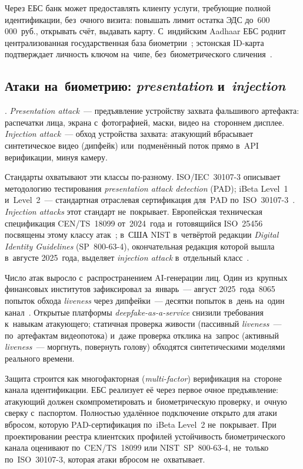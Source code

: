 Через ЕБС банк может предоставлять клиенту услуги, требующие полной
идентификации, без~очного визита: повышать лимит остатка ЭДС до~600\,000~руб.,
открывать счёт, выдавать карту. С~индийским Aadhaar ЕБС роднит
централизованная государственная база биометрии~\cite{uidai-authentication}; эстонская
ID-карта подтверждает личность ключом на~чипе, без~биометрического
сличения~\cite{e-estonia-id-card}.

\subsection*{Атаки на~биометрию: \textit{presentation} и~\textit{injection}}

. \textit{Presentation attack}~--- предъявление
устройству захвата фальшивого артефакта: распечатки лица, экрана с~фотографией,
маски, видео на~стороннем дисплее. \textit{Injection attack}~--- обход
устройства захвата: атакующий вбрасывает синтетическое видео (дипфейк)
или~подменённый поток прямо в~API верификации, минуя камеру.

Стандарты охватывают эти классы по-разному. ISO/IEC~30107-3 описывает
методологию тестирования \textit{presentation attack detection} (PAD); iBeta
Level~1 и~Level~2~--- стандартная отраслевая сертификация для~PAD по~ISO~30107-3~\cite{iso-30107-3}. \textit{Injection attacks} этот стандарт
не~покрывает. Европейская техническая спецификация CEN/TS~18099 от~2024~года
и~готовящийся ISO~25456 посвящены этому классу атак~\cite{cen-ts-18099};
в~США NIST в~четвёртой редакции \textit{Digital Identity Guidelines} (SP~800-63-4),
окончательная редакция которой вышла в~августе 2025~года, выделяет
\textit{injection attack} в~отдельный класс~\cite{nist-sp-800-63-4-2025}.

Число атак выросло с~распространением AI-генерации лиц. Один из~крупных
финансовых институтов зафиксировал за~январь~--- август 2025~года~8065 попыток
обхода \textit{liveness} через дипфейки~--- десятки попыток в~день
на~один канал~\cite{biometricupdate-daas-2026}. Открытые платформы
\textit{deepfake-as-a-service} снизили требования к~навыкам атакующего;
статичная проверка живости (пассивный \textit{liveness}~--- по~артефактам
видеопотока) и~даже проверка отклика на~запрос (активный \textit{liveness}~---
моргнуть, повернуть голову) обходятся синтетическими моделями реального
времени.

Защита строится как многофакторная (\textit{multi-factor}) верификация
на~стороне канала идентификации. ЕБС реализует её через первое очное
предъявление: атакующий должен скомпрометировать и~биометрическую проверку,
и~очную сверку с~паспортом. Полностью удалённое подключение
открыто для атаки вбросом, которую
PAD-сертификация по~iBeta Level~2 не~покрывает. При проектировании реестра клиентских профилей
устойчивость биометрического канала оценивают по~CEN/TS~18099 или
NIST~SP~800-63-4, не~только по~ISO~30107-3, которая атаки вбросом
не~охватывает.

